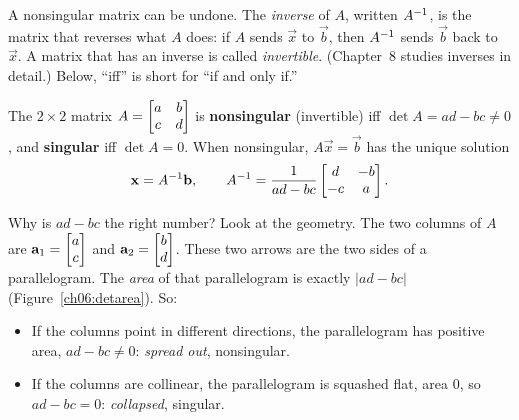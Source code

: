 A nonsingular matrix can be undone. The \emph{inverse} of $A$, written
$A^{-1}$, is the matrix that reverses what $A$ does: if $A$ sends $\vec x$ to
$\vec b$, then $A^{-1}$ sends $\vec b$ back to $\vec x$. A matrix that has an
inverse is called \emph{invertible}. (Chapter~8 studies inverses in
detail.) Below, ``iff'' is short for ``if and only if.''

\begin{formalbox}
The $2\times 2$ matrix $A=\begin{bmatrix}a&b\\c&d\end{bmatrix}$ is \textbf{nonsingular}
(invertible) iff $\det A = ad-bc \neq 0$, and \textbf{singular} iff
$\det A = 0$. When nonsingular, $A\vec x=\vec b$ has the unique solution
\[
  \mathbf{x} = A^{-1} \mathbf{b},\qquad
  A^{-1} = \frac{1}{ad-bc}\begin{bmatrix}d & -b\\ -c & a\end{bmatrix}.
\]
\end{formalbox}

Why is $ad-bc$ the right number? Look at the geometry. The two
columns of $A$ are $\mathbf{a}_1=\begin{bmatrix}a\\c\end{bmatrix}$ and $\mathbf{a}_2=\begin{bmatrix}b\\d\end{bmatrix}$.
These two arrows are the two sides of a parallelogram. The
\emph{area} of that parallelogram is exactly $\lvert ad-bc\rvert$
(Figure~\ref{ch06:detarea}). So:
\begin{itemize}
  \item If the columns point in different directions, the parallelogram has
  positive area, $ad-bc\neq0$: \emph{spread out}, nonsingular.
  \item If the columns are collinear, the parallelogram is squashed flat,
  area $0$, so $ad-bc=0$: \emph{collapsed}, singular.
\end{itemize}

